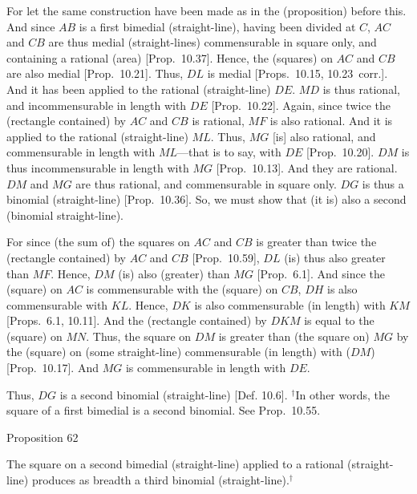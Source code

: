 For let the same construction have been made as in the (proposition) before
this. And since $AB$ is a first bimedial (straight-line), having been divided at $C$, 
$AC$ and $CB$ are thus medial (straight-lines) commensurable
in square only, and containing a rational (area) [Prop.~10.37]. Hence, the (squares) on $AC$ and
$CB$ are also medial [Prop.~10.21]. Thus,
$DL$ is medial [Props.~10.15, 10.23~corr.].  And it has been applied to the
rational (straight-line) $DE$. $MD$ is thus rational, and incommensurable
in length with $DE$ [Prop.~10.22]. Again,
since twice the (rectangle contained) by $AC$ and $CB$ is rational,
$MF$ is also rational. And it is applied to the rational (straight-line)
$ML$. Thus, $MG$ [is] also rational, and commensurable in length
with $ML$---that is to say, with $DE$ [Prop.~10.20]. $DM$ is thus incommensurable in length with $MG$ [Prop.~10.13]. And they are rational. $DM$ and $MG$ are thus rational, and commensurable in square only. $DG$ is thus a binomial (straight-line) [Prop.~10.36]. So, we must show that (it
is) also a second (binomial straight-line).

For since (the sum of) the squares on $AC$ and $CB$ is greater than twice
the (rectangle contained) by $AC$ and $CB$ [Prop.~10.59], $DL$ (is) thus also greater
than $MF$. Hence, $DM$ (is) also (greater) than $MG$ [Prop.~6.1]. And since
the (square) on $AC$ is commensurable with the (square) on $CB$, $DH$
is also commensurable with $KL$. Hence, $DK$ is also commensurable
(in length) with $KM$ [Props.~6.1, 10.11].  And the (rectangle contained) by $DKM$
is equal to the (square) on $MN$. Thus, the square on $DM$ is greater
than (the square on) $MG$ by the (square) on (some straight-line)
commensurable (in length) with ($DM$) [Prop.~10.17]. And $MG$ is commensurable in length
with $DE$.

Thus, $DG$ is a second binomial (straight-line) [Def. 10.6].
{\footnotesize\noindent $^\dag$In other words, the square of a first bimedial is a
second binomial. See Prop.~10.55.}


\begin{center}
{\large Proposition 62}
\end{center}

The square on a second bimedial (straight-line)
applied to  a rational (straight-line) produces as breadth a third binomial
(straight-line).$^\dag$

\epsfysize=1.5in 
\centerline{}

